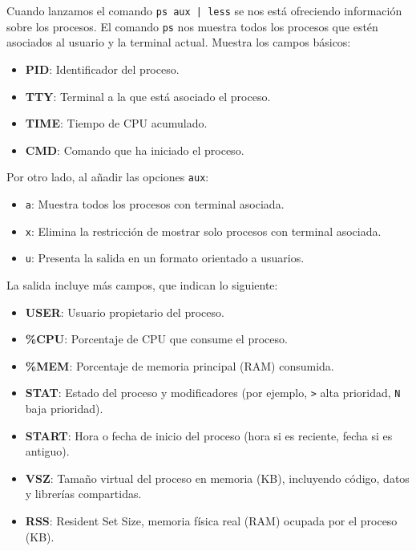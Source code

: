 \documentclass[a4paper,12pt]{article}
\begin{document}
\begin{enumerate}[label=\textbf{Pregunta \arabic*.}]
    Cuando lanzamos el comando \texttt{ps aux | less} se nos está ofreciendo información sobre los procesos. 
    El comando \texttt{ps} nos muestra todos los procesos que estén asociados al usuario y la terminal actual. 
    Muestra los campos básicos: 

    \begin{itemize}
        \item \textbf{PID}: Identificador del proceso.
        \item \textbf{TTY}: Terminal a la que está asociado el proceso.
        \item \textbf{TIME}: Tiempo de CPU acumulado.
        \item \textbf{CMD}: Comando que ha iniciado el proceso.
    \end{itemize}

    Por otro lado, al añadir las opciones \texttt{aux}: 
    \begin{itemize}
        \item \texttt{a}: Muestra todos los procesos con terminal asociada.
        \item \texttt{x}: Elimina la restricción de mostrar solo procesos con terminal asociada.
        \item \texttt{u}: Presenta la salida en un formato orientado a usuarios.
    \end{itemize}

    La salida incluye más campos, que indican lo siguiente:

    \begin{itemize}
        \item \textbf{USER}: Usuario propietario del proceso.
        \item \textbf{\%CPU}: Porcentaje de CPU que consume el proceso.
        \item \textbf{\%MEM}: Porcentaje de memoria principal (RAM) consumida.
        \item \textbf{STAT}: Estado del proceso y modificadores 
        (por ejemplo, \texttt{>} alta prioridad, \texttt{N} baja prioridad).
        \item \textbf{START}: Hora o fecha de inicio del proceso 
        (hora si es reciente, fecha si es antiguo).
        \item \textbf{VSZ}: Tamaño virtual del proceso en memoria (KB), 
        incluyendo código, datos y librerías compartidas.
        \item \textbf{RSS}: Resident Set Size, memoria física real (RAM) ocupada por el proceso (KB).
    \end{itemize}



\end{enumerate}
\end{document}
